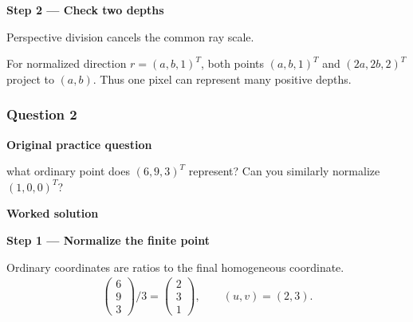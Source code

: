 \documentclass[letterpaper,11pt,english,openany,oneside]{jupyterBook}
\begin{document}
\par\medskip{}
{\color{QuizStepRed}\bfseries Step 2 — Check two depths}\par\smallskip

\sphinxAtStartPar
{} Perspective division cancels the common ray scale.

\sphinxAtStartPar
For normalized direction {\color{QuizMathBlue} \(r=(a,b,1)^T\)}, both points {\color{QuizMathBlue} \((a,b,1)^T\)} and {\color{QuizMathBlue} \((2a,2b,2)^T\)} project to {\color{QuizMathBlue} \((a,b)\)}. Thus one pixel can represent many positive depths.

\par

\par\medskip


\subsubsection{Question 2}
\label{\detokenize{lectures/lecture01/tldr:question-2}}\label{\detokenize{lectures/lecture01/tldr:lec01-tldr-q2}}
\par\medskip\textbf{Original practice question}\par\smallskip

\sphinxAtStartPar
{} what ordinary point does \((6,9,3)^T\) represent? Can you similarly normalize \((1,0,0)^T\)?

\par\medskip

\par\medskip
\textbf{Worked solution}\par\smallskip

\par\medskip{}
{\color{QuizStepRed}\bfseries Step 1 — Normalize the finite point}\par\smallskip

\sphinxAtStartPar
{} Ordinary coordinates are ratios to the final homogeneous coordinate.
{\color{QuizMathBlue} \begin{equation*}
\begin{split}
\begin{pmatrix}6\\9\\3\end{pmatrix}/3=\begin{pmatrix}2\\3\\1\end{pmatrix},\qquad (u,v)=(2,3).
\end{split}
\end{equation*}}
\par
\end{document}
